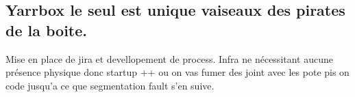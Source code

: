 \documentclass[11pt, a4paper ]{article}
\let\stdsection\section
\renewcommand\section{\newpage\stdsection}
\begin{document}
\begin{spacing}{1.5}

















	



	\section{Yarrbox le seul est unique vaiseaux des pirates de la boite.} %

Mise en place de jira et devellopement de process. 
Infra ne nécessitant aucune présence physique donc startup ++ ou on vas fumer des joint avec les pote pis on code jusqu'a ce que segmentation fault s'en suive.


\end{spacing}
\end{document}
